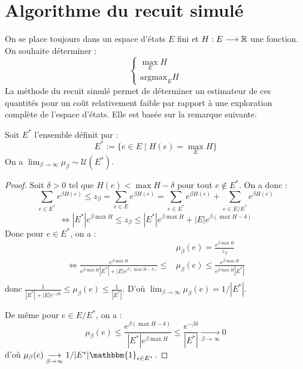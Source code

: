 
\section{Algorithme du recuit simulé}

On se place toujours dans un espace d'états $E$ fini et $H : E \longrightarrow \mathbb{R}$ 
une fonction.
On souhaite déterminer : 
    $$ 
        \begin{cases}
            \max_E H \\ 
            \text{argmax}_E H 
        \end{cases}
    $$
La méthode du recuit simulé permet de déterminer un estimateur de ces quantités 
pour un coût relativement faible par rapport à une exploration complète de l'espace 
d'états. Elle est basée sur la remarque suivante.

\begin{lemma}
    Soit $E^*$ l'ensemble définit par : 
        \begin{equation}
            E^* := \{ e \in E \mid H(e) = \max_E H\}
        \end{equation}
    On a $\lim_{\beta \to \infty} \mu_\beta \sim \mathcal{U}(E^*)$.
\end{lemma}

\begin{proof}
    Soit $ \delta > 0$ tel que $H(e) < \max H - \delta$ pour tout $e \not \in E^*$.
    On a donc : 
        $$ \sum_{e \in E^*} e^{ \beta H(e)} \leqslant z_\beta = \sum_{e \in E} e^{ \beta H(e)} 
        = \sum_{e \in E^*} e^{ \beta H(e)} + \sum_{e \in E/E^*} e^{ \beta H(e)} $$ 
        $$ \iff |E^*| e^{ \beta \max H} \leqslant z_\beta \leqslant |E^*| e^{\beta \max H} + |E| e^{ \beta(\max H - \delta)} $$ 
    Donc pour $ e \in E^*$, on a :
        \begin{align*}
            & \mu_\beta (e) = \frac{e^{ \beta \max H}}{z_\beta} \\ 
            \iff \frac{e^{ \beta \max H}}{e^{ \beta \max H} |E^*| + |E| e^{ \beta (\max H - \delta)}} \leqslant & \mu_\beta (e) \leqslant \frac{e^{ \beta \max H}}{e^{ \beta \max H} |E^*|} \\ 
        \end{align*}
    donc $ \frac{1}{ |E^*| + |E| e^{- \beta \delta}} \leqslant \mu_\beta (e) \leqslant \frac{1}{|E^*|}$. 
    D'où $ \lim_{ \beta \to \infty} \mu_\beta(e) = 1/|E^*|$. 

    De même pour $ e \in E/E^*$, on a : 
        $$ \mu_\beta (e) \leqslant \frac{e^{ \beta (\max H - \delta)}}{ | E^*| e^{ \beta \max H}} \leqslant \frac{e^{- \beta \delta}}{|E^*|} \underset{\beta \to \infty}{\longrightarrow} 0 $$
    d'où $ \mu_\beta (e) \underset{\beta \to \infty}{\longrightarrow} 1/|E^*| \mathbbm{1}_{e \in E^*}$. 
\end{proof} 

